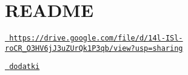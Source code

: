 \chapter{README}
\hypertarget{md_README}{}\label{md_README}
\href{https://drive.google.com/file/d/14l-ISl-roCR_4O3HV6jJ3uZUrQk1P3qb/view?usp=sharing}{\texttt{ https\+://drive.\+google.\+com/file/d/14l-\/\+ISl-\/ro\+CR\+\_\+O3\+HV6j\+J3u\+ZUr\+Qk1\+P3qb/view?usp=sharing}}

\href{https://drive.google.com/file/d/1OxWz1yk_D-l8CDjU2RG8S6jXsSXemPNb/view?usp=sharing}{\texttt{ dodatki}} 